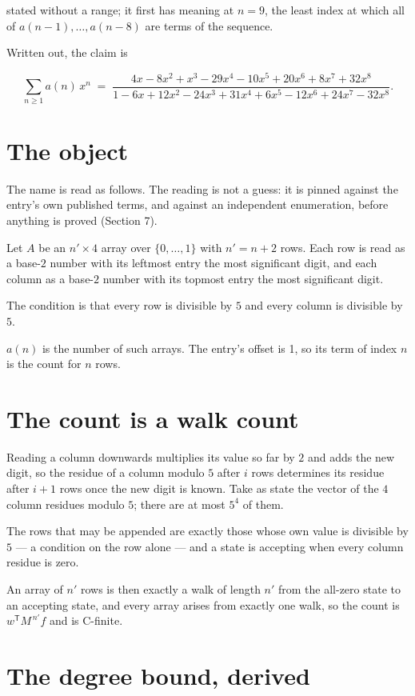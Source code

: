 \documentclass[11pt]{article}
\theoremstyle{definition}
\begin{document}
stated without a range; it first has meaning at $n = 9$, the least index at which all of $a(n-1),\dots,a(n-8)$ are terms of the sequence.

Written out, the claim is

\[\sum_{n \ge 1} a(n)\,x^n \;=\; \frac{4x - 8x^{2} + x^{3} - 29x^{4} - 10x^{5} + 20x^{6} + 8x^{7} + 32x^{8}}{1 - 6x + 12x^{2} - 24x^{3} + 31x^{4} + 6x^{5} - 12x^{6} + 24x^{7} - 32x^{8}}.\]

\section{The object}

The name is read as follows. The reading is not a guess: it is pinned against the entry's own published terms, and against an independent enumeration, before anything is proved (Section 7).

Let $A$ be an $n' \times 4$ array over $\{0,\dots,1\}$ with $n' = n + 2$ rows. Each row is read as a base-$2$ number with its leftmost entry the most significant digit, and each column as a base-$2$ number with its topmost entry the most significant digit.

The condition is that every row is divisible by $5$ and every column is divisible by $5$.

$a(n)$ is the number of such arrays. The entry's offset is 1, so its term of index $n$ is the count for $n$ rows.

\section{The count is a walk count}

Reading a column downwards multiplies its value so far by $2$ and adds the new digit, so the residue of a column modulo $5$ after $i$ rows determines its residue after $i+1$ rows once the new digit is known. Take as state the vector of the $4$ column residues modulo $5$; there are at most $5^{4}$ of them.

The rows that may be appended are exactly those whose own value is divisible by $5$ --- a condition on the row alone --- and a state is accepting when every column residue is zero.

An array of $n'$ rows is then exactly a walk of length $n'$ from the all-zero state to an accepting state, and every array arises from exactly one walk, so the count is $w^{\mathsf T}M^{\,n'}f$ and is C-finite.

\section{The degree bound, derived}
\end{document}
